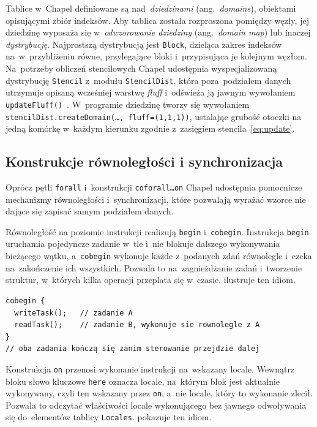   Tablice w~Chapel definiowane są nad~\emph{dziedzinami} (ang.\ \emph{domains}), obiektami opisującymi zbiór indeksów. Aby tablica została rozproszona pomiędzy
  węzły, jej dziedzinę wyposaża się w~\emph{odwzorowanie dziedziny}
  (ang.\ \emph{domain map}) lub inaczej \emph{dystrybucję}. Najprostszą dystrybucją jest \texttt{Block},
dzieląca zakres indeksów na~w~przybliżeniu równe, przylegające bloki i~przypisująca
je kolejnym węzłom. Na~potrzeby obliczeń stencilowych Chapel udostępnia
wyspecjalizowaną dystrybucję \texttt{Stencil} z~modułu \texttt{StencilDist}, która
poza~podziałem danych utrzymuje opisaną wcześniej warstwę \emph{fluff}
i~odświeża ją jawnym wywołaniem \texttt{updateFluff()}~\cite{stencildist}.
W~programie dziedzinę tworzy się wywołaniem
\texttt{stencilDist.\allowbreak createDomain(\ldots,\allowbreak{} fluff=(1,1,1))},
ustalając grubość otoczki na jedną komórkę w~każdym kierunku zgodnie z~zasięgiem
stencila~\eqref{eq:update}.

\subsection{Konstrukcje równoległości i synchronizacja}

Oprócz pętli \texttt{forall} i~konstrukcji \texttt{coforall\ldots on} Chapel udostępnia
pomocnicze mechanizmy równoległości i~synchronizacji, które pozwalają wyrażać wzorce
nie dające się zapisać samym podziałem danych.

Równoległość na poziomie instrukcji realizują \texttt{begin} i~\texttt{cobegin}.
Instrukcja \texttt{begin} uruchamia pojedyncze zadanie w~tle i~nie blokuje dalszego
wykonywania bieżącego wątku, a~\texttt{cobegin} wykonuje każde z~podanych zdań
równolegle i~czeka na~zakończenie ich wszystkich. Pozwala to na~zagnieżdżanie
zadań i~tworzenie struktur, w~których kilka operacji przeplata się w~czasie.
 ilustruje ten idiom.

\begin{lstlisting}[language=Chapel, caption={Równoległe uruchamianie zadań za pomocą \texttt{cobegin}.}, label={lst:cobegin}]
cobegin {
  writeTask();   // zadanie A
  readTask();    // zadanie B, wykonuje sie rownolegle z A
}
// oba zadania kończą się zanim sterowanie przejdzie dalej
\end{lstlisting}

Konstrukcja \texttt{on} przenosi wykonanie instrukcji na~wskazany locale. Wewnątrz
bloku słowo kluczowe \texttt{here} oznacza locale, na~którym blok jest aktualnie
wykonywany, czyli ten wskazany przez \texttt{on}, a~nie locale, który to wykonanie
zlecił. Pozwala to odczytać właściwości locale wykonującego bez jawnego odwoływania
się do~elementów tablicy \texttt{Locales}.  pokazuje ten idiom.

